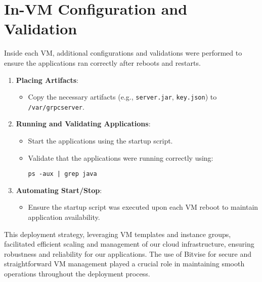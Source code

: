 \section{In-VM Configuration and Validation}\label{sec:in-vm-configuration-and-validation}

Inside each VM, additional configurations and validations were performed to ensure the applications ran correctly after reboots and restarts.

\begin{enumerate}
    \item \textbf{Placing Artifacts}:
    \begin{itemize}
        \item Copy the necessary artifacts (e.g., \texttt{server.jar}, \texttt{key.json}) to \texttt{/var/grpcserver}.
    \end{itemize}

    \item \textbf{Running and Validating Applications}:
    \begin{itemize}
        \item Start the applications using the startup script.
        \item Validate that the applications were running correctly using:
        \begin{verbatim}
ps -aux | grep java
        \end{verbatim}
    \end{itemize}

    \item \textbf{Automating Start/Stop}:
    \begin{itemize}
        \item Ensure the startup script was executed upon each VM reboot to maintain application availability.
    \end{itemize}
\end{enumerate}

This deployment strategy, leveraging VM templates and instance groups, facilitated efficient scaling and management of our cloud infrastructure, ensuring robustness and reliability for our applications.
The use of Bitvise for secure and straightforward VM management played a crucial role in maintaining smooth operations throughout the deployment process.
